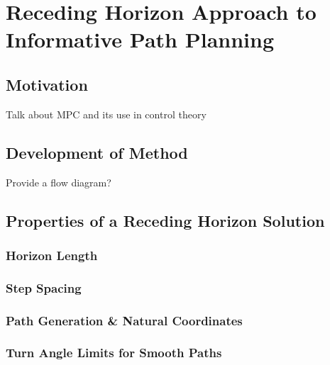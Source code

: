 \chapter{Receding Horizon Approach to Informative Path Planning}
\label{RecedingHorizonApproach}

	\section{Motivation}
	
		Talk about MPC and its use in control theory
		
	\section{Development of Method}
	
%		
		
		Provide a flow diagram?
		
	\section{Properties of a Receding Horizon Solution}
	
		\subsection{Horizon Length}
		
		\subsection{Step Spacing}
		
		\subsection{Path Generation \& Natural Coordinates}
		
		\subsection{Turn Angle Limits for Smooth Paths}
		

